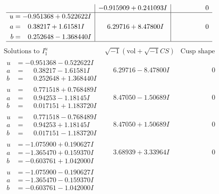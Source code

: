 \documentclass[1p]{elsarticle_modified}
\theoremstyle{definition}
\newcommand{\I}{\sqrt{-1}}
\begin{document}
$$\begin{array}{c|c|c}
 & -0.915909 + 0.241093 I & \phantom{-0.000000 } 0 \\ \hline\begin{aligned}
u &= -0.951368 + 0.522622 I \\
a &= \phantom{-}0.38217 + 1.61581 I \\
b &= \phantom{-}0.252648 - 1.368440 I\end{aligned}
 & \phantom{-}6.29716 + 8.47800 I & \phantom{-0.000000 } 0\\
 \hline 
 \end{array}$$\newpage$$\begin{array}{c|c|c}  
\text{Solutions to }I^u_{1}& \I (\text{vol} + \sqrt{-1}CS) & \text{Cusp shape}\\
 \hline 
\begin{aligned}
u &= -0.951368 - 0.522622 I \\
a &= \phantom{-}0.38217 - 1.61581 I \\
b &= \phantom{-}0.252648 + 1.368440 I\end{aligned}
 & \phantom{-}6.29716 - 8.47800 I & \phantom{-0.000000 } 0 \\ \hline\begin{aligned}
u &= \phantom{-}0.771518 + 0.768489 I \\
a &= \phantom{-}0.94253 - 1.18145 I \\
b &= \phantom{-}0.017151 + 1.183720 I\end{aligned}
 & \phantom{-}8.47050 - 1.50689 I & \phantom{-0.000000 } 0 \\ \hline\begin{aligned}
u &= \phantom{-}0.771518 - 0.768489 I \\
a &= \phantom{-}0.94253 + 1.18145 I \\
b &= \phantom{-}0.017151 - 1.183720 I\end{aligned}
 & \phantom{-}8.47050 + 1.50689 I & \phantom{-0.000000 } 0 \\ \hline\begin{aligned}
u &= -1.075900 + 0.190627 I \\
a &= -1.365470 + 0.159370 I \\
b &= -0.603761 + 1.042000 I\end{aligned}
 & \phantom{-}3.68939 + 3.33964 I & \phantom{-0.000000 } 0 \\ \hline\begin{aligned}
u &= -1.075900 - 0.190627 I \\
a &= -1.365470 - 0.159370 I \\
b &= -0.603761 - 1.042000 I\end{aligned}

\end{array}$$
\end{document}
